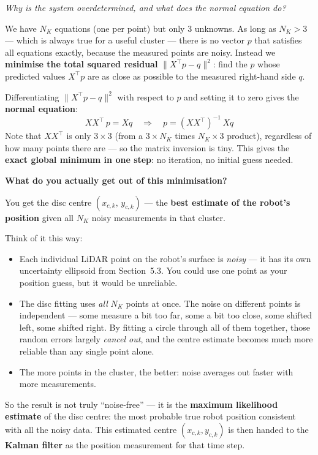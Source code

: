 \documentclass[12pt, a4paper]{article}
\begin{document}
\textit{Why is the system overdetermined, and what does the normal
equation do?}

We have $N_K$ equations (one per point) but only 3 unknowns.
As long as $N_K > 3$ --- which is always true for a useful cluster ---
there is no vector $p$ that satisfies all equations exactly, because
the measured points are noisy.
Instead we \textbf{minimise the total squared residual}
$\|X^\top p - q\|^2$: find the $p$ whose predicted values
$X^\top p$ are as close as possible to the measured right-hand side $q$.

Differentiating $\|X^\top p - q\|^2$ with respect to $p$ and setting
it to zero gives the \textbf{normal equation}:
\[
  XX^\top\, p = Xq
  \quad\Longrightarrow\quad
  p = (XX^\top)^{-1}\, Xq
\]
Note that $XX^\top$ is only $3\times 3$ (from a $3\times N_K$ times
$N_K\times 3$ product), regardless of how many points there are ---
so the matrix inversion is tiny.
This gives the \textbf{exact global minimum in one step}: no
iteration, no initial guess needed.

\begin{keybox}
  \textbf{What do you actually get out of this minimisation?}

  You get the disc centre $(x_{c,k},\, y_{c,k})$ --- the
  \textbf{best estimate of the robot's position} given all $N_K$ noisy
  measurements in that cluster.

  Think of it this way:
  \begin{itemize}[leftmargin=1.2em,itemsep=3pt]
    \item Each individual LiDAR point on the robot's surface is
      \emph{noisy} --- it has its own uncertainty ellipsoid from
      Section~5.3.
      You could use one point as your position guess, but it would be
      unreliable.
    \item The disc fitting uses \emph{all} $N_K$ points at once.
      The noise on different points is independent --- some measure a bit
      too far, some a bit too close, some shifted left, some shifted right.
      By fitting a circle through all of them together, those random
      errors largely \emph{cancel out}, and the centre estimate becomes
      much more reliable than any single point alone.
    \item The more points in the cluster, the better: noise averages
      out faster with more measurements.
  \end{itemize}
  So the result is not truly ``noise-free'' --- it is the
  \textbf{maximum likelihood estimate} of the disc centre: the most
  probable true robot position consistent with all the noisy data.
  This estimated centre $(x_{c,k}, y_{c,k})$ is then handed to the
  \textbf{Kalman filter} as the position measurement for that time step.
\end{keybox}
\end{document}
